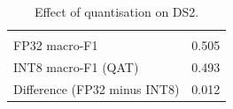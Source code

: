 \begin{table}[H]
  \centering
  \caption{Effect of quantisation on DS2.}
  \label{tab:quantization-ds2}
  \begin{tabularx}{\linewidth}{lR}
     &  \\
    FP32 macro-F1 & 0.505 \\
    INT8 macro-F1 (QAT) & 0.493 \\
    Difference (FP32 minus INT8) & 0.012 \\
    \bottomrule
  \end{tabularx}
\end{table}
